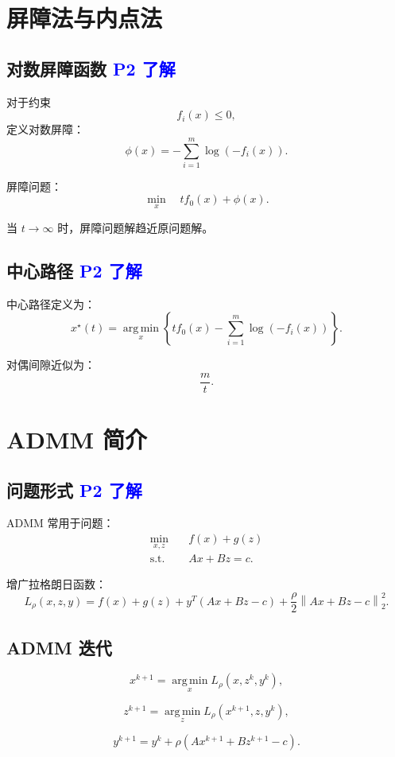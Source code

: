 \documentclass[11pt,a4paper]{ctexart}
\newcommand{\argmin}{\operatorname*{arg\,min}}
\newcommand{\st}{\text{s.t.}}
\newcommand{\norm}[1]{\left\lVert #1 \right\rVert}
\newcommand{\Ptwo}{\textcolor{blue}{\textbf{P2 了解}}}
\theoremstyle{definition}
\theoremstyle{plain}
\theoremstyle{remark}
\begin{document}
\section{屏障法与内点法}

\subsection{对数屏障函数 \Ptwo}

对于约束
\[
    f_i(x)\le0,
\]
定义对数屏障：
\[
    \phi(x)
    =
    -\sum_{i=1}^m \log(-f_i(x)).
\]

屏障问题：
\[
    \min_x
    \quad
    t f_0(x)+\phi(x).
\]

当 $t\to\infty$ 时，屏障问题解趋近原问题解。

\subsection{中心路径 \Ptwo}

中心路径定义为：
\[
    x^\star(t)=
    \argmin_x
    \left\{
    t f_0(x)
    -
    \sum_{i=1}^m \log(-f_i(x))
    \right\}.
\]

对偶间隙近似为：
\[
    \frac{m}{t}.
\]

\section{ADMM 简介}

\subsection{问题形式 \Ptwo}

ADMM 常用于问题：
\[
\begin{aligned}
    \min_{x,z}\quad & f(x)+g(z)\\
    \st\quad & Ax+Bz=c.
\end{aligned}
\]

增广拉格朗日函数：
\[
    L_\rho(x,z,y)
    =
    f(x)+g(z)
    +
    y^T(Ax+Bz-c)
    +
    \frac{\rho}{2}\norm{Ax+Bz-c}_2^2.
\]

\subsection{ADMM 迭代}

\[
    x^{k+1}
    =
    \argmin_x
    L_\rho(x,z^k,y^k),
\]

\[
    z^{k+1}
    =
    \argmin_z
    L_\rho(x^{k+1},z,y^k),
\]

\[
    y^{k+1}
    =
    y^k+\rho(Ax^{k+1}+Bz^{k+1}-c).
\]
\end{document}
